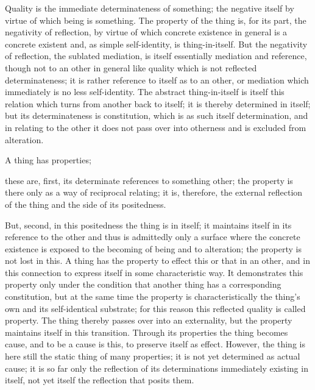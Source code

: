 Quality is the immediate determinateness of something;
the negative itself by virtue of which being is something.
The property of the thing is, for its part,
the negativity of reflection,
by virtue of which concrete existence
in general is a concrete existent
and, as simple self-identity, is thing-in-itself.
But the negativity of reflection, the sublated mediation,
is itself essentially mediation and reference,
though not to an other in general like quality
which is not reflected determinateness;
it is rather reference to itself as to an other,
or mediation which immediately is no less self-identity.
The abstract thing-in-itself is itself this relation
which turns from another back to itself;
it is thereby determined in itself;
but its determinateness is constitution,
which is as such itself determination,
and in relating to the other
it does not pass over into otherness
and is excluded from alteration.

A thing has properties;

these are, first, its determinate references to something other;
the property is there only as a way of reciprocal relating;
it is, therefore, the external reflection of the thing
and the side of its positedness.

But, second, in this positedness the thing is in itself;
it maintains itself in its reference to the other
and thus is admittedly only a surface
where the concrete existence is exposed to
the becoming of being and to alteration;
the property is not lost in this.
A thing has the property to effect this or that in an other,
and in this connection to express itself in some characteristic way.
It demonstrates this property only under the condition
that another thing has a corresponding constitution,
but at the same time the property is characteristically
the thing's own and its self-identical substrate;
for this reason this reflected quality is called property.
The thing thereby passes over into an externality,
but the property maintains itself in this transition.
Through its properties the thing becomes cause,
and to be a cause is this, to preserve itself as effect.
However, the thing is here still the static thing of many properties;
it is not yet determined as actual cause;
it is so far only the reflection of
its determinations immediately existing in itself,
not yet itself the reflection that posits them.

